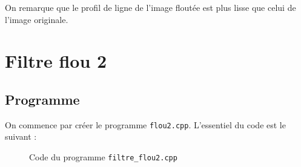 \documentclass[french,a4paper,10pt]{article}
\begin{document}
    On remarque que le profil de ligne de l'image floutée est plus lisse que celui de l'image originale.

    \newpage
    \section{Filtre flou 2}\label{sec:4}

    \subsection{Programme}\label{subsec:4.1}

    On commence par créer le programme \texttt{flou2.cpp}.
    L'essentiel du code est le suivant :
    \begin{figure}[!htb]
        \centering
        \caption{Code du programme \texttt{filtre\_flou2.cpp}}\label{Fig:code-filtre-flou2}
    \end{figure}
\end{document}
